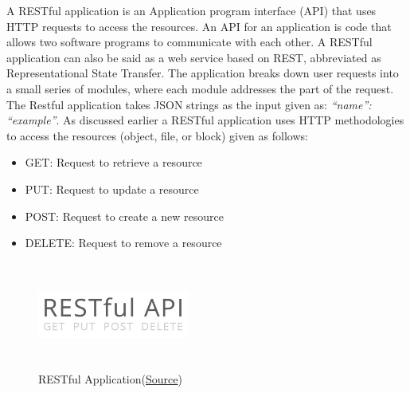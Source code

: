 \documentclass[12pt]{article}
\begin{document}
A RESTful application is an Application program interface (API) that uses HTTP requests to access the resources. An API for an application is code that allows two software programs to communicate with each other.
A RESTful application can also be said as a web service based on REST, abbreviated as Representational State Transfer. The application breaks down user requests into a small series of modules, where each module addresses the part of the request. The Restful application takes JSON strings as the input given as: \emph{{“name”: “example”}}. As discussed earlier a RESTful application uses HTTP methodologies to access the resources (object, file, or block) given as follows:
\begin{itemize}
    \item GET: Request to retrieve a resource
    \item PUT: Request to update a resource
    \item POST: Request to create a new resource
    \item DELETE: Request to remove a resource
\end{itemize}
\begin{figure}
    \centering
    \includegraphics[width=5cm, height=3.5cm]{../report_MemeEcon/images/restful_api.jpg}
    \caption{RESTful Application(\href{https://b2evolution.net/man/rest-api/}{Source})}
    \label{fig:Restful}
\end{figure}
\end{document}

